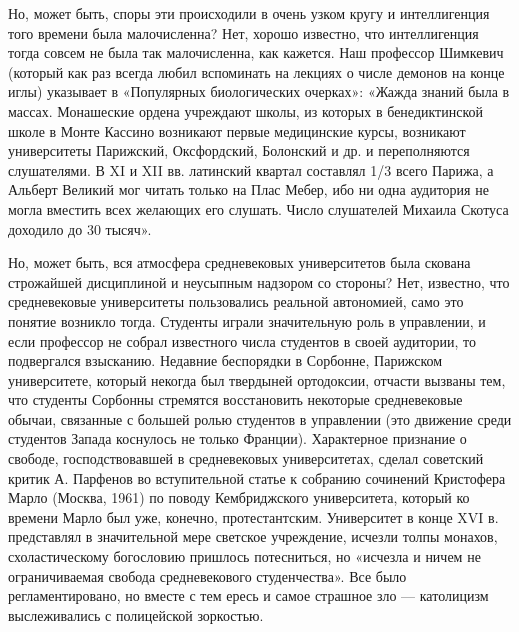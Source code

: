 Но,  может  быть,  споры  эти   происходили  в  очень  узком  кругу  и
интеллигенция того  времени была  малочисленна? Нет,  хорошо известно,
что интеллигенция тогда совсем не  была так малочисленна, как кажется.
Наш профессор  Шимкевич (который  как раз  всегда любил  вспоминать на
лекциях  о  числе  демонов  на конце  иглы)  указывает  в  «Популярных
биологических очерках»: «Жажда знаний была в массах. Монашеские ордена
учреждают школы,  из которых  в бенедиктинской  школе в  Монте Кассино
возникают первые медицинские  курсы, возникают университеты Парижский,
Оксфордский, Болонский и  др. и переполняются слушателями. В  XI и XII
вв. латинский  квартал составлял 1/3  всего Парижа, а  Альберт Великий
мог  читать только  на  Плас Мебер,  ибо ни  одна  аудитория не  могла
вместить всех  желающих его слушать. Число  слушателей Михаила Скотуса
доходило до 30 тысяч».

Но, может быть, вся атмосфера средневековых университетов была скована
строжайшей дисциплиной и неусыпным надзором со стороны? Нет, известно,
что средневековые университеты  пользовались реальной автономией, само
это  понятие  возникло  тогда.  Студенты играли  значительную  роль  в
управлении,  и если  профессор  не собрал  известного числа  студентов
в  своей  аудитории,  то подвергался  взысканию.  Недавние  беспорядки
в  Сорбонне, Парижском  университете,  который  некогда был  твердыней
ортодоксии,  отчасти  вызваны  тем, что  студенты  Сорбонны  стремятся
восстановить некоторые средневековые обычаи, связанные с большей ролью
студентов в управлении (это  движение среди студентов Запада коснулось
не только Франции). Характерное  признание о свободе, господствовавшей
в средневековых университетах, сделал  советский критик А. Парфенов во
вступительной статье  к собранию  сочинений Кристофера  Марло (Москва,
1961)  по  поводу  Кембриджского   университета,  который  ко  времени
Марло был  уже, конечно,  протестантским. Университет  в конце  XVI в.
представлял  в значительной  мере светское  учреждение, исчезли  толпы
монахов, схоластическому богословию  пришлось потесниться, но «исчезла
и ничем  не ограничиваемая  свобода средневекового  студенчества». Все
было регламентировано, но вместе с тем  ересь и самое страшное зло ---
католицизм выслеживались с полицейской зоркостью.

